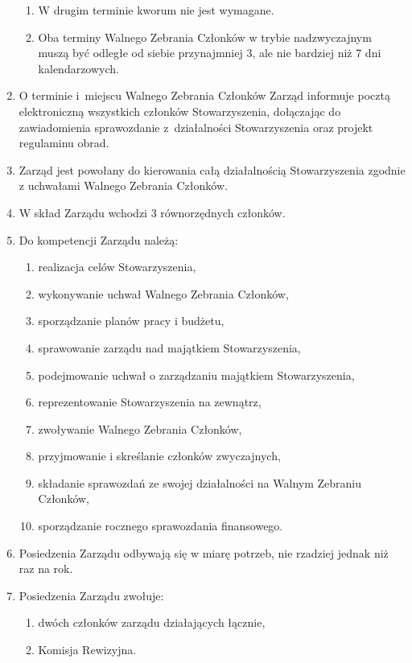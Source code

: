 \documentclass{article}
\begin{document}
\begin{enumerate}
\begin{enumerate}
        \item W drugim terminie kworum nie jest wymagane.
        \item Oba terminy Walnego Zebrania Członków w trybie nadzwyczajnym muszą być odległe od siebie przynajmniej 3, ale nie bardziej niż 7 dni kalendarzowych.
      \end{enumerate}
    \item O terminie i~miejscu Walnego Zebrania Członków Zarząd informuje pocztą elektroniczną wszystkich członków Stowarzyszenia, dołączając do zawiadomienia sprawozdanie z~działalności Stowarzyszenia oraz projekt regulaminu obrad.
    \item Zarząd jest powołany do kierowania całą działalnością Stowarzyszenia zgodnie z uchwałami Walnego Zebrania Członków.
    \item W skład Zarządu wchodzi 3 równorzędnych członków.
    \item Do kompetencji Zarządu należą:
      \begin{enumerate}
        \item realizacja celów Stowarzyszenia,
        \item wykonywanie uchwał Walnego Zebrania Członków,
        \item sporządzanie planów pracy i budżetu,
        \item sprawowanie zarządu nad majątkiem Stowarzyszenia,
        \item podejmowanie uchwał o zarządzaniu majątkiem Stowarzyszenia,
        \item reprezentowanie Stowarzyszenia na zewnątrz,
        \item zwoływanie Walnego Zebrania Członków,
        \item przyjmowanie i skreślanie członków zwyczajnych,
        \item składanie sprawozdań ze swojej działalności na Walnym Zebraniu Członków,
        \item sporządzanie rocznego sprawozdania finansowego.
      \end{enumerate}
    \item Posiedzenia Zarządu odbywają się w miarę potrzeb, nie rzadziej jednak niż raz na rok.
    \item Posiedzenia Zarządu zwołuje:
      \begin{enumerate}
        \item dwóch członków zarządu działających łącznie,
        \item Komisja Rewizyjna.
      \end{enumerate}

\end{enumerate}
\end{document}
